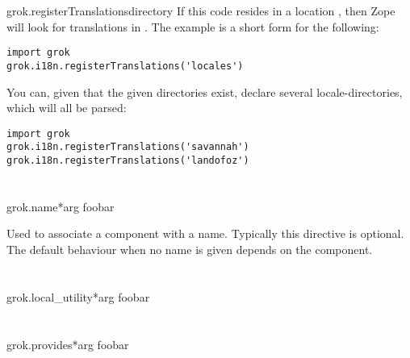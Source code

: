 \begin{funcdesc}{grok.registerTranslations}{directory}
          If this code resides in a location , then
          Zope will look for translations in . The
          example is a short form for the following:

          \begin{verbatim}
import grok
grok.i18n.registerTranslations('locales')
          \end{verbatim}

          You can, given that the given directories exist, declare
          several locale-directories, which will all be parsed:

          \begin{verbatim}
import grok
grok.i18n.registerTranslations('savannah')
grok.i18n.registerTranslations('landofoz')
          \end{verbatim}
         

        \end{funcdesc}

    \section{}

        \begin{funcdesc}{grok.name}{*arg}
        foobar
        \end{funcdesc}

        Used to associate a component with a name. Typically this directive is
        optional. The default behaviour when no name is given depends on the
        component.

    \section{}

        \begin{funcdesc}{grok.local_utility}{*arg}
        foobar
        \end{funcdesc}

    \section{}

        \begin{funcdesc}{grok.provides}{*arg}
        foobar
        \end{funcdesc}

    \section{}

